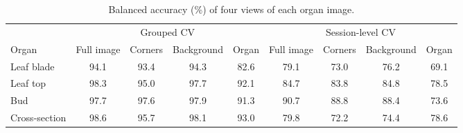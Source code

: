 \begin{table}[tbp]
\centering
\footnotesize
\caption{Balanced accuracy (\%) of four views of each organ image.}
\label{tab:organ_audit}
\begin{adjustbox}{max width=\textwidth}
\begin{tabular}{lcccccccc}
\toprule
 & \multicolumn{4}{c}{Grouped CV} & \multicolumn{4}{c}{Session-level CV} \\ \cmidrule(lr){2-5}\cmidrule(lr){6-9}
Organ & Full image & Corners & Background & Organ & Full image & Corners & Background & Organ \\
\midrule
Leaf blade & 94.1 & 93.4 & 94.3 & 82.6 & 79.1 & 73.0 & 76.2 & 69.1 \\
Leaf top & 98.3 & 95.0 & 97.7 & 92.1 & 84.7 & 83.8 & 84.8 & 78.5 \\
Bud & 97.7 & 97.6 & 97.9 & 91.3 & 90.7 & 88.8 & 88.4 & 73.6 \\
Cross-section & 98.6 & 95.7 & 98.1 & 93.0 & 79.8 & 72.2 & 74.4 & 78.6 \\
\bottomrule
\end{tabular}
\end{adjustbox}
\end{table}